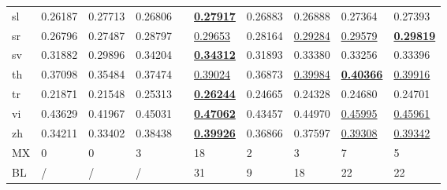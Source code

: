 \begin{longtable}{llllllllll}
sl & 0.26187 & 0.27713 & 0.26806 &  & \underline{\textbf{0.27917}} & 0.26883 & 0.26888 & 0.27364 & 0.27393 \\
sr & 0.26796 & 0.27487 & 0.28797 &  & \underline{0.29653} & 0.28164 & \underline{0.29284} & \underline{0.29579} & \underline{\textbf{0.29819}} \\
sv & 0.31882 & 0.29896 & 0.34204 &  & \underline{\textbf{0.34312}} & 0.31893 & 0.33380 & 0.33256 & 0.33396 \\
th & 0.37098 & 0.35484 & 0.37474 &  & \underline{0.39024} & 0.36873 & \underline{0.39984} & \underline{\textbf{0.40366}} & \underline{0.39916} \\
tr & 0.21871 & 0.21548 & 0.25313 &  & \underline{\textbf{0.26244}} & 0.24665 & 0.24328 & 0.24680 & 0.24701 \\
vi & 0.43629 & 0.41967 & 0.45031 &  & \underline{\textbf{0.47062}} & 0.43457 & 0.44970 & \underline{0.45995} & \underline{0.45961} \\
zh & 0.34211 & 0.33402 & 0.38438 &  & \underline{\textbf{0.39926}} & 0.36866 & 0.37597 & \underline{0.39308} & \underline{0.39342} \\
\hline 
MX & 0 & 0 & 3 &  & 18 & 2 & 3 & 7 & 5 \\
BL & / & / & / &  & 31 & 9 & 18 & 22 & 22 \\
\hline 
\hline 
\end{longtable} 
